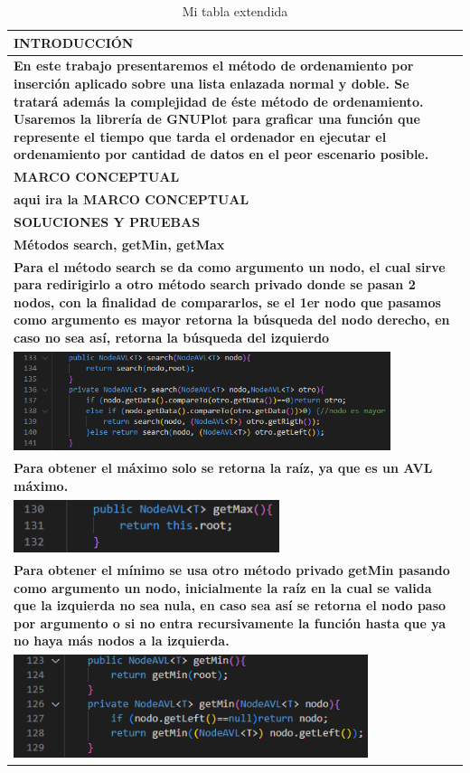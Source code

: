 \documentclass[9pt]{article}
\begin{document}
	\begin{longtable}{|p{15cm}|}
		\caption{Mi tabla extendida}\\
		\hline 
		\rowcolor{tablebackground}
		\color{white}\textbf{INTRODUCCIÓN}  \\
		\hline 
		\textbf{En este trabajo presentaremos el método de ordenamiento por inserción aplicado sobre una lista enlazada normal y doble. Se tratará además la complejidad de éste método de ordenamiento. Usaremos la librería de GNUPlot para graficar una función que represente el tiempo que tarda el ordenador en ejecutar el ordenamiento por cantidad de datos en el peor escenario posible.}  \\
		\hline 
		\rowcolor{tablebackground}
		\color{white}\textbf{MARCO CONCEPTUAL}  \\
		\hline 
		\textbf{aqui ira la MARCO CONCEPTUAL}  \\
		\hline 
		\rowcolor{tablebackground}
		\color{white}\textbf{SOLUCIONES Y PRUEBAS}  \\
		\hline 
		\textbf{Métodos search, getMin, getMax}\\
		\textbf{Para el método search se da como argumento un nodo,
		 el cual sirve para redirigirlo a otro método search privado 
		 donde se pasan 2 nodos, con la finalidad de compararlos, 
		 se el 1er nodo que pasamos como argumento es mayor retorna
		  la búsqueda del nodo derecho, en caso no sea así, retorna
		   la búsqueda del izquierdo}\\
		\includegraphics[width=0.85\textwidth,keepaspectratio]{img/search.png}\\
		\textbf{Para obtener el máximo solo se retorna la raíz, ya que es un AVL máximo.		}\\
		\includegraphics[width=0.6\textwidth,keepaspectratio]{img/getMax.png}\\
		\textbf{Para obtener el mínimo se usa otro método privado getMin 
		pasando como argumento un nodo, inicialmente la raíz en la cual 
		se valida que la izquierda no sea nula, en caso sea así se retorna 
		el nodo paso por argumento o si no entra recursivamente  la función 
		hasta que ya no haya más nodos a la izquierda.}  \\
		\includegraphics[width=0.8\textwidth,keepaspectratio]{img/getMin.png}\\
		

\end{longtable}
\end{document}
